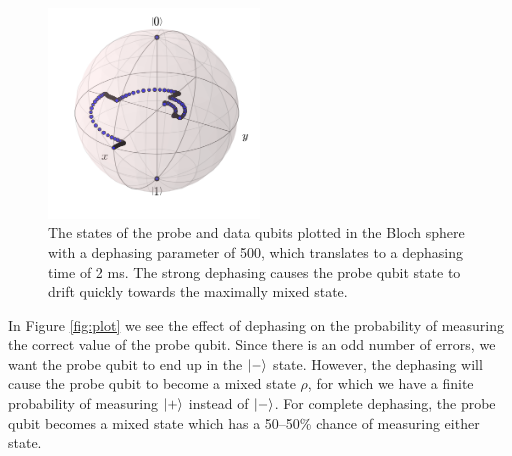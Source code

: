 \begin{figure}[!h]
  \centering
    \includegraphics[width=0.5\textwidth]{Figures/Circ_orbit_odd_500_dephasing.png}
      \caption{The states of the probe and data qubits plotted in the Bloch sphere with a dephasing parameter of 500, which translates to a dephasing time of 2 ms. The strong dephasing causes the probe qubit state to drift quickly towards the maximally mixed state. }
\end{figure}

In Figure \ref{fig:plot} we see the effect of dephasing on the probability of measuring the correct value of the probe qubit. Since there is an odd number of errors, we want the probe qubit to end up in the $\ket{-}$ state. However, the dephasing will cause the probe qubit to become a mixed state $\rho$, for which we have a finite probability of measuring $\ket{+} $ instead of $\ket{-}$. For complete dephasing, the probe qubit becomes a mixed state which has a 50--50\% chance of measuring either state. 


